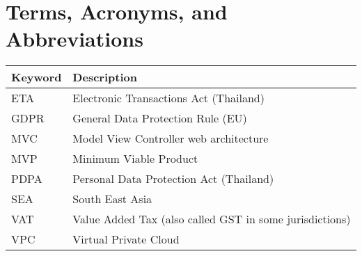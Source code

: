 \chapter*{Terms, Acronyms, and Abbreviations}

\begin{tabular}{@{}>{\raggedright\arraybackslash}p{2cm} p{}@{}}
	\textbf{Keyword} & \textbf{Description} \\
	\hline
	ETA  & Electronic Transactions Act (Thailand) \\
	GDPR & General Data Protection Rule (EU) \\
	MVC & Model View Controller web architecture \\
	MVP  & Minimum Viable Product \\
	PDPA  & Personal Data Protection Act (Thailand) \\
	SEA & South East Asia \\
	VAT & Value Added Tax (also called GST in some jurisdictions) \\
	VPC & Virtual Private Cloud \\
	\hline
\end{tabular}

\vspace{1cm}


\clearpage
